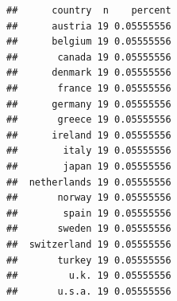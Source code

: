 \documentclass[]{gitbook}
\newenvironment{Shaded}{\begin{snugshade}}{\end{snugshade}}
\newcommand{\DataTypeTok}[1]{\textcolor[rgb]{0.13,0.29,0.53}{#1}}
\newcommand{\KeywordTok}[1]{\textcolor[rgb]{0.13,0.29,0.53}{\textbf{#1}}}
\newcommand{\NormalTok}[1]{#1}
\newcommand{\OperatorTok}[1]{\textcolor[rgb]{0.81,0.36,0.00}{\textbf{#1}}}
\newcommand{\StringTok}[1]{\textcolor[rgb]{0.31,0.60,0.02}{#1}}
\theoremstyle{definition}
\theoremstyle{definition}
\theoremstyle{definition}
\theoremstyle{remark}
\begin{document}
\begin{Shaded}
\end{Shaded}

\begin{verbatim}
##      country  n    percent
##      austria 19 0.05555556
##      belgium 19 0.05555556
##       canada 19 0.05555556
##      denmark 19 0.05555556
##       france 19 0.05555556
##      germany 19 0.05555556
##       greece 19 0.05555556
##      ireland 19 0.05555556
##        italy 19 0.05555556
##        japan 19 0.05555556
##  netherlands 19 0.05555556
##       norway 19 0.05555556
##        spain 19 0.05555556
##       sweden 19 0.05555556
##  switzerland 19 0.05555556
##       turkey 19 0.05555556
##         u.k. 19 0.05555556
##       u.s.a. 19 0.05555556
\end{verbatim}

\begin{Shaded}
\end{Shaded}
\end{document}
